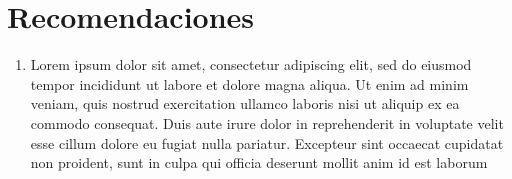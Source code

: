 \chapter*{Recomendaciones}


\begin{enumerate}
	\item Lorem ipsum dolor sit amet, consectetur adipiscing elit, sed do eiusmod tempor incididunt ut labore et dolore magna aliqua. Ut enim ad minim veniam, quis nostrud exercitation ullamco laboris nisi ut aliquip ex ea commodo consequat. Duis aute irure dolor in reprehenderit in voluptate velit esse cillum dolore eu fugiat nulla pariatur. Excepteur sint occaecat cupidatat non proident, sunt in culpa qui officia deserunt mollit anim id est laborum
\end{enumerate}
